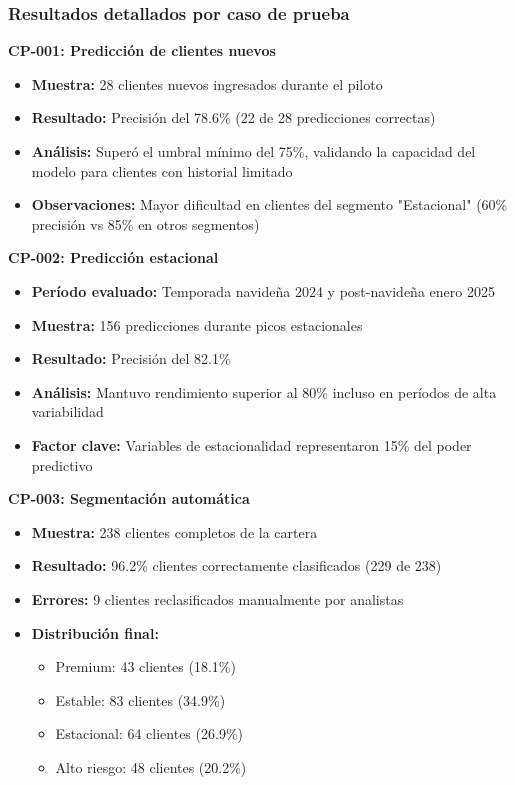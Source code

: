 \subsubsection{Resultados detallados por caso de prueba}

\textbf{CP-001: Predicción de clientes nuevos}
\begin{itemize}
    \item \textbf{Muestra:} 28 clientes nuevos ingresados durante el piloto
    \item \textbf{Resultado:} Precisión del 78.6\% (22 de 28 predicciones correctas)
    \item \textbf{Análisis:} Superó el umbral mínimo del 75\%, validando la capacidad del modelo para clientes con historial limitado
    \item \textbf{Observaciones:} Mayor dificultad en clientes del segmento "Estacional" (60\% precisión vs 85\% en otros segmentos)
\end{itemize}

\textbf{CP-002: Predicción estacional}
\begin{itemize}
    \item \textbf{Período evaluado:} Temporada navideña 2024 y post-navideña enero 2025
    \item \textbf{Muestra:} 156 predicciones durante picos estacionales
    \item \textbf{Resultado:} Precisión del 82.1\%
    \item \textbf{Análisis:} Mantuvo rendimiento superior al 80\% incluso en períodos de alta variabilidad
    \item \textbf{Factor clave:} Variables de estacionalidad representaron 15\% del poder predictivo
\end{itemize}

\textbf{CP-003: Segmentación automática}
\begin{itemize}
    \item \textbf{Muestra:} 238 clientes completos de la cartera
    \item \textbf{Resultado:} 96.2\% clientes correctamente clasificados (229 de 238)
    \item \textbf{Errores:} 9 clientes reclasificados manualmente por analistas
    \item \textbf{Distribución final:}
    \begin{itemize}
        \item Premium: 43 clientes (18.1\%)
        \item Estable: 83 clientes (34.9\%)
        \item Estacional: 64 clientes (26.9\%)
        \item Alto riesgo: 48 clientes (20.2\%)
    \end{itemize}
\end{itemize}

